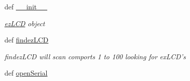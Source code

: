 \begin{DoxyCompactItemize}
\item 
def \hyperlink{namespacemodule_1_1ez_l_c_d3xx_a8ace0b81799bcaa1829882f30bfd6aca}{\-\_\-\-\_\-init\-\_\-\-\_\-}
\begin{DoxyCompactList}\small\item\em \hyperlink{classmodule_1_1ez_l_c_d3xx_1_1ez_l_c_d}{ez\-L\-C\-D} object \end{DoxyCompactList}\item 
def \hyperlink{namespacemodule_1_1ez_l_c_d3xx_a8d08a702c1004849e434b9c6ca7bb7bd}{findez\-L\-C\-D}
\begin{DoxyCompactList}\small\item\em findez\-L\-C\-D will scan comports 1 to 100 looking for ex\-L\-C\-D's \end{DoxyCompactList}\item 
\hypertarget{namespacemodule_1_1ez_l_c_d3xx_ab6fff8f5df6d853d0fdb06295699d796}{def \hyperlink{namespacemodule_1_1ez_l_c_d3xx_ab6fff8f5df6d853d0fdb06295699d796}{open\-Serial}}\label{d2/d2f/namespacemodule_1_1ez_l_c_d3xx_ab6fff8f5df6d853d0fdb06295699d796}


\end{DoxyCompactItemize}
